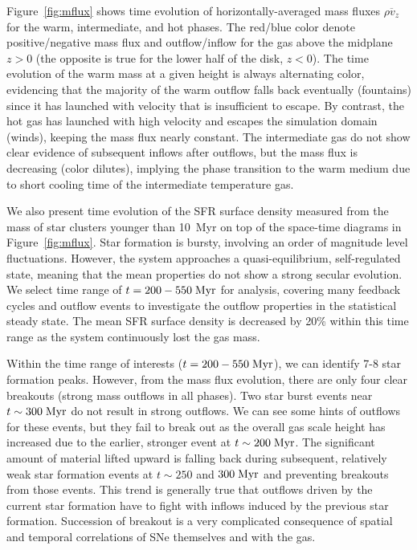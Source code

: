 \documentclass[twocolumn]{aastex62}
\newcommand\Myr{\;{\rm Myr}}
\begin{document}
Figure~\ref{fig:mflux} shows time evolution of horizontally-averaged mass fluxes $\overline{\rho v_z}$ for the warm, intermediate, and hot phases. The red/blue color denote positive/negative mass flux and outflow/inflow for the gas  above the midplane $z>0$ (the opposite is true for the lower half of the disk, $z<0$). The time evolution of the warm mass at a given height is always alternating color, evidencing that the majority of the warm outflow falls back eventually (fountains) since it has launched with velocity that is insufficient to escape. By contrast, the hot gas has launched with high velocity and escapes the simulation domain (winds), keeping the mass flux nearly constant. The intermediate gas do not show clear evidence of subsequent inflows after outflows, but the mass flux is decreasing (color dilutes), implying the phase transition to the warm medium due to short cooling time of the intermediate temperature gas.

We also present time evolution of the SFR surface density measured from the mass of star clusters younger than 10~Myr on top of the space-time diagrams in Figure~\ref{fig:mflux}. Star formation is bursty, involving an order of magnitude level fluctuations. However, the system approaches a quasi-equilibrium, self-regulated state, meaning that the mean properties do not show a strong secular evolution. We select time range of $t=200-550\Myr$ for analysis, covering many feedback cycles and outflow events to investigate the outflow properties in the statistical steady state. The mean SFR surface density is decreased by 20\% within this time range as the system continuously lost the gas mass.

Within the time range of interests ($t=200-550\Myr$), we can identify 7-8 star formation peaks. However, from the mass flux evolution, there are only four clear breakouts (strong mass outflows in all phases). Two star burst events near $t\sim300\Myr$ do not result in strong outflows. We can see some hints of outflows for these events, but they fail to break out as the overall gas scale height has increased due to the earlier, stronger event at $t\sim 200\Myr$. The significant amount of material lifted upward is falling back during subsequent, relatively weak star formation events at $t\sim 250$ and $300\Myr$ and preventing breakouts from those events. This trend is generally true that outflows driven by the current star formation have to fight with inflows induced by the previous star formation. Succession of breakout is a very complicated consequence of spatial and temporal correlations of SNe themselves and with the gas.
\end{document}
